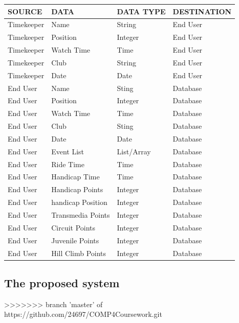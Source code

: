 \begin{tabular}{|l|l|l|l|}
\hline
SOURCE & DATA & DATA TYPE & DESTINATION  \\ \hline
Timekeeper & Name & String & End User  \\ \hline
Timekeeper & Position & Integer & End User  \\ \hline
Timekeeper & Watch Time & Time & End User  \\ \hline
Timekeeper & Club & String & End User  \\ \hline
Timekeeper & Date & Date& End User  \\ \hline
End User & Name & Sting & Database   \\ \hline
End User & Position & Integer & Database  \\ \hline
End User & Watch Time & Time & Database  \\ \hline
End User & Club & Sting & Database  \\ \hline
End User & Date & Date & Database  \\ \hline
End User & Event List & List/Array & Database  \\ \hline
End User & Ride Time & Time & Database  \\ \hline
End User & Handicap Time & Time & Database  \\ \hline
End User & Handicap Points & Integer & Database  \\ \hline
End User & handicap Position & Integer & Database  \\ \hline
End User & Transmedia Points & Integer & Database  \\ \hline
End User & Circuit Points & Integer & Database \\ \hline
End User & Juvenile Points & Integer & Database  \\ \hline
End User & Hill Climb Points & Integer & Database  \\ \hline
\end{tabular}
\subsection{The proposed system}
>>>>>>> branch 'master' of https://github.com/24697/COMP4Coursework.git

